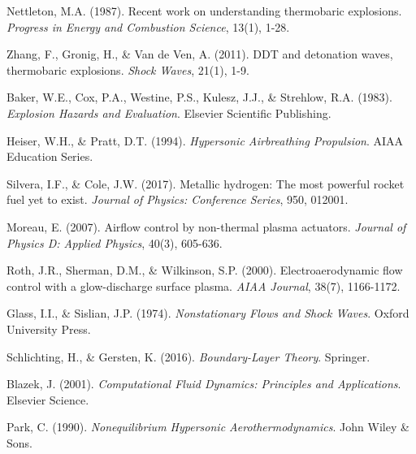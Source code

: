 \documentclass[12pt,a4paper]{article}
\begin{document}
\begin{thebibliography}{99}
Nettleton, M.A. (1987). Recent work on understanding thermobaric explosions. \textit{Progress in Energy and Combustion Science}, 13(1), 1-28.

Zhang, F., Gronig, H., \& Van de Ven, A. (2011). DDT and detonation waves, thermobaric explosions. \textit{Shock Waves}, 21(1), 1-9.

Baker, W.E., Cox, P.A., Westine, P.S., Kulesz, J.J., \& Strehlow, R.A. (1983). \textit{Explosion Hazards and Evaluation}. Elsevier Scientific Publishing.

Heiser, W.H., \& Pratt, D.T. (1994). \textit{Hypersonic Airbreathing Propulsion}. AIAA Education Series.

Silvera, I.F., \& Cole, J.W. (2017). Metallic hydrogen: The most powerful rocket fuel yet to exist. \textit{Journal of Physics: Conference Series}, 950, 012001.

Moreau, E. (2007). Airflow control by non-thermal plasma actuators. \textit{Journal of Physics D: Applied Physics}, 40(3), 605-636.

Roth, J.R., Sherman, D.M., \& Wilkinson, S.P. (2000). Electroaerodynamic flow control with a glow-discharge surface plasma. \textit{AIAA Journal}, 38(7), 1166-1172.

Glass, I.I., \& Sislian, J.P. (1974). \textit{Nonstationary Flows and Shock Waves}. Oxford University Press.

Schlichting, H., \& Gersten, K. (2016). \textit{Boundary-Layer Theory}. Springer.

Blazek, J. (2001). \textit{Computational Fluid Dynamics: Principles and Applications}. Elsevier Science.

Park, C. (1990). \textit{Nonequilibrium Hypersonic Aerothermodynamics}. John Wiley \& Sons.

\end{thebibliography}
\end{document}
